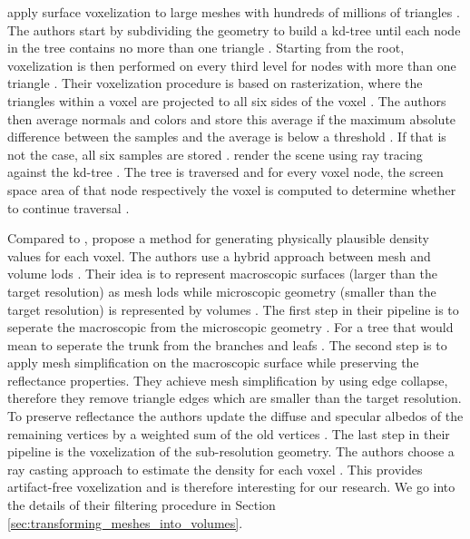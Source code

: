 \citeauthor{afra_voxel_lods} apply surface voxelization to large meshes with hundreds of millions of triangles \cite{afra_voxel_lods}.
The authors start by subdividing the geometry to build a kd-tree until each node in the tree contains no more than one triangle \cite{afra_voxel_lods}.
Starting from the root, voxelization is then performed on every third level for nodes with more than one triangle \cite{afra_voxel_lods}.
Their voxelization procedure is based on rasterization, where the triangles within a voxel are projected to all six sides of the voxel \cite{afra_voxel_lods}.
The authors then average normals and colors and store this average if the maximum absolute difference between the samples and the average is below a threshold \cite{afra_voxel_lods}.
If that is not the case, all six samples are stored \cite{afra_voxel_lods}.
\citeauthor{afra_voxel_lods} render the scene using ray tracing against the kd-tree \cite{afra_voxel_lods}.
The tree is traversed and for every voxel node, the screen space area of that node respectively the voxel is computed to determine whether to continue traversal \cite{afra_voxel_lods}.

Compared to \citeauthor{afra_voxel_lods}, \citeauthor{hybrid_mesh_volume_lods} propose a method for generating physically plausible density values for each voxel.
The authors use a hybrid approach between mesh and volume \acp{lod} \cite{hybrid_mesh_volume_lods}.
Their idea is to represent macroscopic surfaces (larger than the target resolution) as mesh \acsp{lod} while microscopic geometry (smaller than the target resolution) is represented by volumes \cite{hybrid_mesh_volume_lods}.
The first step in their pipeline is to seperate the macroscopic from the microscopic geometry \cite{hybrid_mesh_volume_lods}.
For a tree that would mean to seperate the trunk from the branches and leafs \cite{hybrid_mesh_volume_lods}.
The second step is to apply mesh simplification on the macroscopic surface while preserving the reflectance properties.
They achieve mesh simplification by using edge collapse, therefore they remove triangle edges which are smaller than the target resolution.
To preserve reflectance the authors update the diffuse and specular albedos of the remaining vertices by a weighted sum of the old vertices \cite{hybrid_mesh_volume_lods}.
The last step in their pipeline is the voxelization of the sub-resolution geometry.
The authors choose a ray casting approach to estimate the density for each voxel \cite{hybrid_mesh_volume_lods}.
This provides artifact-free voxelization and is therefore interesting for our research.
We go into the details of their filtering procedure in Section \ref{sec:transforming_meshes_into_volumes}.





